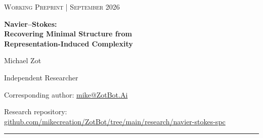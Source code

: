 \documentclass[11pt]{article}
\numberwithin{equation}{section}
\theoremstyle{highend}
\theoremstyle{definition}
\begin{document}
\thispagestyle{empty}
\begin{center}
  \vspace*{0.38in}
  {\small\scshape Working Preprint \quad | \quad September 2026}\par
  \vspace{0.10in}
  {\fontsize{22}{26}\selectfont\bfseries
  Navier--Stokes:\\[0.12em]
  Recovering Minimal Structure from\\
  Representation-Induced Complexity\par}
  \vspace{0.22in}
  {\large Michael Zot}\par
  \vspace{0.08in}
  {\small Independent Researcher}\par
  \vspace{0.05in}
  {\small Corresponding author: \href{mailto:mike@ZotBot.Ai}{mike@ZotBot.Ai}}\par
  \vspace{0.04in}
  {\footnotesize Research repository: \href{https://github.com/mikecreation/ZotBot/tree/main/research/navier-stokes-spc}{github.com/mikecreation/ZotBot/tree/main/research/navier-stokes-spc}}\par
  \vspace{0.12in}
  \rule{0.72\textwidth}{0.45pt}\par
  \vspace{0.18in}
\end{center}
\end{document}
